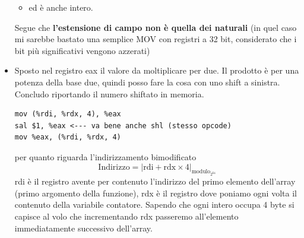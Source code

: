 \documentclass[11pt]{report}
\theoremstyle{definition}
\begin{document}
\begin{itemize}
\begin{framed}
\begin{itemize}
	\item ed è anche intero.
\end{itemize}
Segue che \textbf{l'estensione di campo non è quella dei naturali} (in quel caso mi sarebbe bastato una semplice MOV con registri a 32 bit, considerato che i bit più significativi vengono azzerati)
\end{framed}
\item Sposto nel registro eax il valore da moltiplicare per due. Il prodotto è per una potenza della base due, quindi posso fare la cosa con uno shift a sinistra. Concludo riportando il numero shiftato in memoria.
\begin{verbatim}
mov (%rdi, %rdx, 4), %eax
sal $1, %eax <--- va bene anche shl (stesso opcode)
mov %eax, (%rdi, %rdx, 4)
\end{verbatim}
per quanto riguarda l'indirizzamento bimodificato
\[\text{Indirizzo}=\left|\text{rdi}+\text{rdx}\times\text{4}\right|_{\text{modulo}_{2^{64}}}\]
rdi è il registro avente per contenuto l'indirizzo del primo elemento dell'array (primo argomento della funzione), rdx è il registro dove poniamo ogni volta il contenuto della variabile contatore. Sapendo che ogni intero occupa 4 byte si capisce al volo che incrementando rdx passeremo all'elemento immediatamente successivo dell'array.
\end{itemize}
\end{document}
